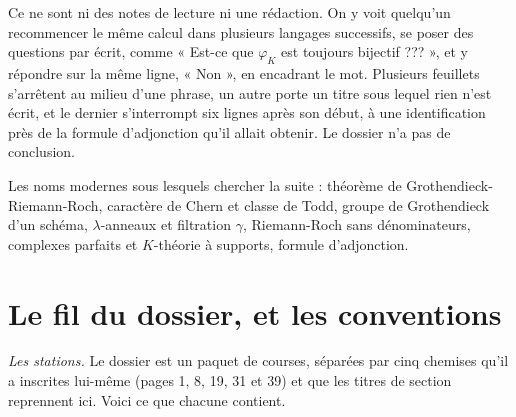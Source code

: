 \documentclass[11pt,a4paper]{article}
\begin{document}
\begin{resume}
Ce ne sont ni des notes de lecture ni une rédaction. On y voit quelqu'un
recommencer le même calcul dans plusieurs langages successifs, se poser des
questions par écrit, comme « Est-ce que $\varphi_{K}$ est toujours bijectif ??? »,
et y répondre sur la même ligne, « Non », en encadrant le mot. Plusieurs
feuillets s'arrêtent au milieu d'une phrase, un autre porte un titre sous lequel
rien n'est écrit, et le dernier s'interrompt six lignes après son début, à une
identification près de la formule d'adjonction qu'il allait obtenir. Le dossier
n'a pas de conclusion.

Les noms modernes sous lesquels chercher la suite : théorème de
Grothendieck-Riemann-Roch, caractère de Chern et classe de Todd, groupe de
Grothendieck d'un schéma, $\lambda$-anneaux et filtration $\gamma$,
Riemann-Roch sans dénominateurs, complexes parfaits et $K$-théorie à supports,
formule d'adjonction.

\end{resume}

\section*{Le fil du dossier, et les conventions}

\emph{Les stations.} Le dossier est un paquet de courses, séparées par cinq
chemises qu'il a inscrites lui-même (pages 1, 8, 19, 31 et 39) et que les
titres de section reprennent ici. Voici ce que chacune contient.
\end{document}
